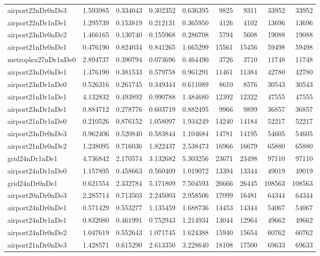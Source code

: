 \begin{longtable}{|l|r|r|r|r|r|r|r|r|}
airport22nDr0nDe3 & 1.593985 & 0.334043 & 0.302352 & 0.636395 & 9825 & 9311 & 33952 & 33952 \\
airport22nDr1nDe1 & 1.295739 & 0.153819 & 0.212131 & 0.365950 & 4126 & 4102 & 13696 & 13696 \\
airport23nDr0nDe2 & 1.466165 & 0.130740 & 0.155968 & 0.286708 & 5794 & 5608 & 19088 & 19088 \\
airport21nDr0nDe1 & 0.476190 & 0.824034 & 0.841265 & 1.665299 & 15561 & 15456 & 59498 & 59498 \\
metroplex27nDr1nDe0 & 2.894737 & 0.390794 & 0.073696 & 0.464490 & 3726 & 3710 & 11748 & 11748 \\
airport23nDr0nDe1 & 1.476190 & 0.381533 & 0.579758 & 0.961291 & 11461 & 11384 & 42780 & 42780 \\
airport23nDr1nDe0 & 0.526316 & 0.261745 & 0.349344 & 0.611089 & 8610 & 8576 & 30543 & 30543 \\
airport21nDr1nDe1 & 4.132832 & 0.493892 & 0.990788 & 1.484680 & 12392 & 12322 & 47555 & 47555 \\
airport23nDr1nDe1 & 0.884712 & 0.278776 & 0.603719 & 0.882495 & 9966 & 9899 & 36857 & 36857 \\
airport21nDr1nDe0 & 0.210526 & 0.876152 & 1.058097 & 1.934249 & 14240 & 14184 & 52217 & 52217 \\
airport23nDr0nDe3 & 0.962406 & 0.520840 & 0.583844 & 1.104684 & 14781 & 14195 & 54605 & 54605 \\
airport21nDr0nDe2 & 1.238095 & 0.716036 & 1.822437 & 2.538473 & 16966 & 16679 & 65880 & 65880 \\
grid24nDr1nDe1 & 4.736842 & 2.170574 & 3.132682 & 5.303256 & 23671 & 23498 & 97110 & 97110 \\
airport24nDr1nDe0 & 1.157895 & 0.458663 & 0.560409 & 1.019072 & 13394 & 13344 & 49019 & 49019 \\
grid24nDr0nDe1 & 0.621554 & 2.332784 & 5.171809 & 7.504593 & 26666 & 26445 & 108563 & 108563 \\
airport20nDr0nDe3 & 2.285714 & 0.713503 & 2.245003 & 2.958506 & 17099 & 16481 & 64344 & 64344 \\
airport24nDr0nDe1 & 0.571429 & 0.553277 & 1.135459 & 1.688736 & 14453 & 14344 & 54067 & 54067 \\
airport24nDr1nDe1 & 0.832080 & 0.461991 & 0.752943 & 1.214934 & 13044 & 12964 & 49662 & 49662 \\
airport24nDr0nDe2 & 1.047619 & 0.552643 & 1.071745 & 1.624388 & 15940 & 15654 & 60762 & 60762 \\
airport21nDr0nDe3 & 1.428571 & 0.615290 & 2.613350 & 3.228640 & 18108 & 17500 & 69633 & 69633 \\

\end{longtable}
